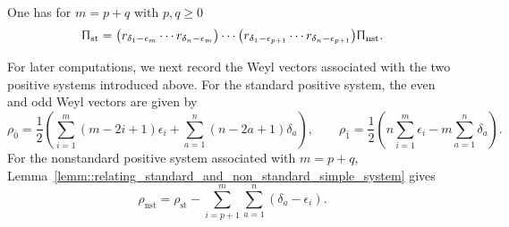 \begin{lemma}\label{lemm::relating_standard_and_non_standard_simple_system}
One has for $m=p+q$ with $p,q\geq 0$
\begin{equation*}
\Uppi_{\mathrm{st}}
=
\bigl(r_{\delta_1-\epsilon_m}\cdots r_{\delta_n-\epsilon_m}\bigr)
\cdots
\bigl(r_{\delta_1-\epsilon_{p+1}}\cdots r_{\delta_n-\epsilon_{p+1}}\bigr)
\Uppi_{\mathrm{nst}}.
\end{equation*}
\end{lemma}

For later computations, we next record the Weyl vectors associated with the two positive systems introduced above. For the standard positive system, the even and odd Weyl vectors are given by
\begin{equation}
\rho_{\bar0}
=
\frac12
\left(
\sum_{i=1}^m(m-2i+1)\epsilon_i
+
\sum_{a=1}^n(n-2a+1)\delta_a
\right),
\qquad
\rho_{\bar1}
=
\frac12
\left(
n\sum_{i=1}^m\epsilon_i
-
m\sum_{a=1}^n\delta_a
\right).
\label{eq:rho}
\end{equation}
For the nonstandard positive system associated with $m=p+q$, Lemma~\ref{lemm::relating_standard_and_non_standard_simple_system} gives
\begin{equation}
\rho_{\mathrm{nst}}
=
\rho_{\mathrm{st}}
-
\sum_{i=p+1}^m\sum_{a=1}^n(\delta_a-\epsilon_i).
\label{eq:rho-standard-nonstandard}
\end{equation}

